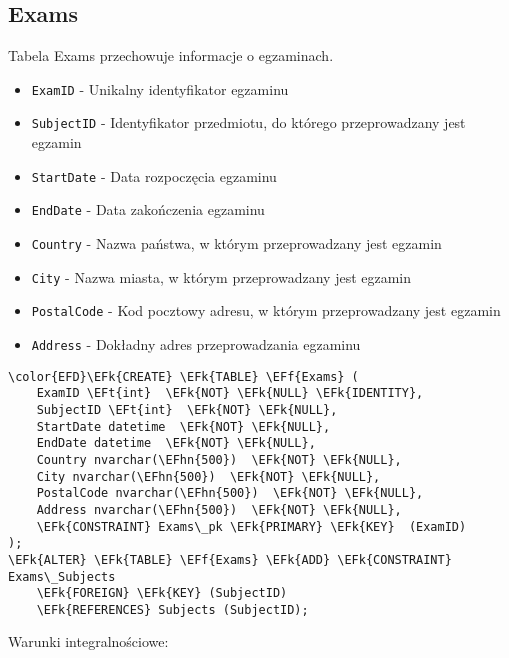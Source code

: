 \documentclass[11pt]{article}
\newcommand{\EFk}[1]{\textcolor{EFk}{\textbf{#1}}} %
\newcommand{\EFf}[1]{\textcolor{EFf}{#1}} %
\newcommand{\EFt}[1]{\textcolor{EFt}{\textbf{#1}}} %
\newcommand{\EFhn}[1]{\textcolor{EFhn}{#1}} %
\begin{document}
\subsection{Exams}
\label{sec:org73c04f2}
Tabela Exams przechowuje informacje o egzaminach.
\begin{itemize}
\item \texttt{ExamID} - Unikalny identyfikator egzaminu
\item \texttt{SubjectID} - Identyfikator przedmiotu, do którego przeprowadzany jest egzamin
\item \texttt{StartDate} - Data rozpoczęcia egzaminu
\item \texttt{EndDate} - Data zakończenia egzaminu
\item \texttt{Country} - Nazwa państwa, w którym przeprowadzany jest egzamin
\item \texttt{City} - Nazwa miasta, w którym przeprowadzany jest egzamin
\item \texttt{PostalCode} - Kod pocztowy adresu, w którym przeprowadzany jest egzamin
\item \texttt{Address} - Dokładny adres przeprowadzania egzaminu
\end{itemize}
\begin{Code}
\begin{Verbatim}
\color{EFD}\EFk{CREATE} \EFk{TABLE} \EFf{Exams} (
    ExamID \EFt{int}  \EFk{NOT} \EFk{NULL} \EFk{IDENTITY},
    SubjectID \EFt{int}  \EFk{NOT} \EFk{NULL},
    StartDate datetime  \EFk{NOT} \EFk{NULL},
    EndDate datetime  \EFk{NOT} \EFk{NULL},
    Country nvarchar(\EFhn{500})  \EFk{NOT} \EFk{NULL},
    City nvarchar(\EFhn{500})  \EFk{NOT} \EFk{NULL},
    PostalCode nvarchar(\EFhn{500})  \EFk{NOT} \EFk{NULL},
    Address nvarchar(\EFhn{500})  \EFk{NOT} \EFk{NULL},
    \EFk{CONSTRAINT} Exams\_pk \EFk{PRIMARY} \EFk{KEY}  (ExamID)
);
\EFk{ALTER} \EFk{TABLE} \EFf{Exams} \EFk{ADD} \EFk{CONSTRAINT} Exams\_Subjects
    \EFk{FOREIGN} \EFk{KEY} (SubjectID)
    \EFk{REFERENCES} Subjects (SubjectID);
\end{Verbatim}
\end{Code}
Warunki integralnościowe:
\end{document}

